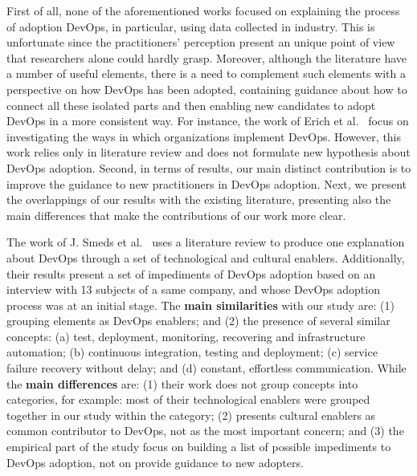 

First of all, none of the aforementioned works focused on explaining the process of adoption DevOps,
in particular, using data collected in industry. This is unfortunate since the
practitioners' perception present an unique point of view that researchers
alone could hardly grasp. Moreover, although the literature have a number of
useful elements, there is a need to complement such elements with a perspective on how DevOps has
been adopted, containing guidance about how to connect all these isolated parts
and then enabling new candidates to adopt DevOps in a more consistent way.
For instance, the work of Erich et al.~\cite{qualitative_devops_journalsw_17}
focus on investigating the ways in which organizations implement DevOps.
However, this work relies only in literature review and does not formulate
new hypothesis about DevOps adoption. Second,
in terms of results, our main distinct contribution is to improve the guidance
to new practitioners in DevOps adoption.
Next, we present the overlappings of our
results with the existing literature, presenting also the main differences that
make the contributions of our work more clear.

The work of J. Smeds et al.~\cite{devops_a_definition_xp_15} uses a literature
review to produce one explanation about DevOps through a set of technological and
cultural enablers. Additionally, their results
present a set of impediments of DevOps adoption based on an interview with 13
subjects of a same company, and whose DevOps adoption process was at
an initial stage. The \textbf{main similarities} with our study are: (1) grouping
elements as DevOps enablers; and (2) the presence of several similar concepts:
(a) test, deployment, monitoring, recovering and infrastructure automation;
(b) continuous integration, testing and deployment; (c) service failure recovery
without delay; and (d) constant, effortless communication. While the \textbf{main
differences} are: (1) their work does not group concepts into categories,
for example: most of their technological enablers were grouped together in our
study within the  category; (2) presents cultural enablers as
common contributor to DevOps, not as the most important concern; and (3) the empirical
part of the study focus on building a list of possible impediments to DevOps
adoption, not on provide guidance to new adopters.

